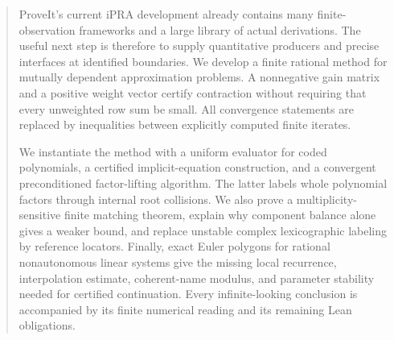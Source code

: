 \documentclass[11pt]{article}
\numberwithin{equation}{section}
\theoremstyle{definition}
\begin{document}
\begin{abstract}
ProveIt's current iPRA development already contains many finite-observation frameworks and a large library of actual derivations. The useful next step is therefore to supply quantitative producers and precise interfaces at identified boundaries. We develop a finite rational method for mutually dependent approximation problems. A nonnegative gain matrix and a positive weight vector certify contraction without requiring that every unweighted row sum be small. All convergence statements are replaced by inequalities between explicitly computed finite iterates.

We instantiate the method with a uniform evaluator for coded polynomials, a certified implicit-equation construction, and a convergent preconditioned factor-lifting algorithm. The latter labels whole polynomial factors through internal root collisions. We also prove a multiplicity-sensitive finite matching theorem, explain why component balance alone gives a weaker bound, and replace unstable complex lexicographic labeling by reference locators. Finally, exact Euler polygons for rational nonautonomous linear systems give the missing local recurrence, interpolation estimate, coherent-name modulus, and parameter stability needed for certified continuation. Every infinite-looking conclusion is accompanied by its finite numerical reading and its remaining Lean obligations.
\end{abstract}
\tableofcontents
\clearpage{}









\appendix


\end{document}

